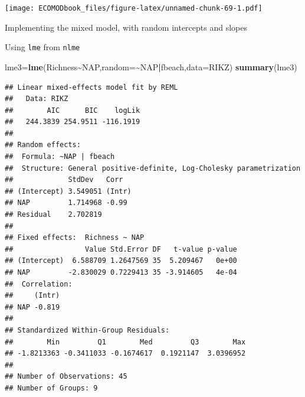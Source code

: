 \documentclass[
]{book}
\newenvironment{Shaded}{\begin{snugshade}}{\end{snugshade}}
\newcommand{\AttributeTok}[1]{\textcolor[rgb]{0.13,0.29,0.53}{#1}}
\newcommand{\CommentTok}[1]{\textcolor[rgb]{0.56,0.35,0.01}{\textit{#1}}}
\newcommand{\ControlFlowTok}[1]{\textcolor[rgb]{0.13,0.29,0.53}{\textbf{#1}}}
\newcommand{\DecValTok}[1]{\textcolor[rgb]{0.00,0.00,0.81}{#1}}
\newcommand{\FunctionTok}[1]{\textcolor[rgb]{0.13,0.29,0.53}{\textbf{#1}}}
\newcommand{\NormalTok}[1]{#1}
\newcommand{\OtherTok}[1]{\textcolor[rgb]{0.56,0.35,0.01}{#1}}
\newcommand{\SpecialCharTok}[1]{\textcolor[rgb]{0.81,0.36,0.00}{\textbf{#1}}}
\begin{document}
\begin{Shaded}
\end{Shaded}

\texttt{[image: ECOMODbook\_files/figure-latex/unnamed-chunk-69-1.pdf]}

Implementing the mixed model, with random intercepts and slopes

Using \texttt{lme} from \texttt{nlme}

\begin{Shaded}
\begin{Highlighting}[]
\NormalTok{lme3}\OtherTok{=}\FunctionTok{lme}\NormalTok{(Richness}\SpecialCharTok{\textasciitilde{}}\NormalTok{NAP,}\AttributeTok{random=}\SpecialCharTok{\textasciitilde{}}\NormalTok{NAP}\SpecialCharTok{|}\NormalTok{fbeach,}\AttributeTok{data=}\NormalTok{RIKZ)}
\FunctionTok{summary}\NormalTok{(lme3)}
\end{Highlighting}
\end{Shaded}

\begin{verbatim}
## Linear mixed-effects model fit by REML
##   Data: RIKZ 
##        AIC      BIC    logLik
##   244.3839 254.9511 -116.1919
## 
## Random effects:
##  Formula: ~NAP | fbeach
##  Structure: General positive-definite, Log-Cholesky parametrization
##             StdDev   Corr  
## (Intercept) 3.549051 (Intr)
## NAP         1.714968 -0.99 
## Residual    2.702819       
## 
## Fixed effects:  Richness ~ NAP 
##                 Value Std.Error DF   t-value p-value
## (Intercept)  6.588709 1.2647569 35  5.209467   0e+00
## NAP         -2.830029 0.7229413 35 -3.914605   4e-04
##  Correlation: 
##     (Intr)
## NAP -0.819
## 
## Standardized Within-Group Residuals:
##        Min         Q1        Med         Q3        Max 
## -1.8213363 -0.3411033 -0.1674617  0.1921147  3.0396952 
## 
## Number of Observations: 45
## Number of Groups: 9
\end{verbatim}
\end{document}
